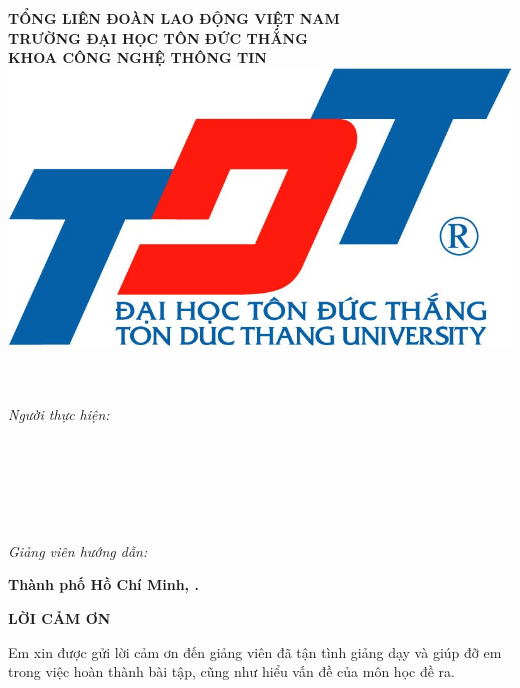 \begin{center}
	\large{\textbf{TỔNG LIÊN ĐOÀN LAO ĐỘNG VIỆT NAM}} \\
	\large{\textbf{TRƯỜNG ĐẠI HỌC TÔN ĐỨC THẮNG}} \\
	\large{\textbf{KHOA CÔNG NGHỆ THÔNG TIN}} \\\vspace*{1cm}	
	\includegraphics[width=0.5\linewidth]{lib/TDTlogo.jpg}\\\vspace*{1cm}	
	\uppercase{\Large{\textbf{\bai}}\\\vspace*{0.3cm}		
	\LARGE{\textbf{\de}}\\\vspace*{2cm}}
\begin{flushright}			
	\large{\textit{Người thực hiện:}} \\
		\large{\textbf{\tacgia}}\\
	\large{\textbf{\mstacgia}}\\
	\large{\textbf{\svhai}} \\
	\large{\textbf{\msvhai}}\\
	\large{\textbf{\svba}}\\
	\large{\textbf{\msvba}}\\

	\large{\textit{Giảng viên hướng dẫn:}} \\
	\large{\textbf{\gvhd}} 
	\vspace*{2cm}
\end{flushright}
	\large{\textbf{Thành phố Hồ Chí Minh, \nam.}}
\end{center}	
	\newpage
\begin{center}
	\Large{\textbf{LỜI CẢM ƠN}}
\end{center}
	Em xin được gửi lời cảm ơn đến giảng viên \gvhd đã tận tình giảng dạy và giúp đỡ em trong việc hoàn thành bài tập, cũng như hiểu vấn đề của môn học đề ra.\\
	
